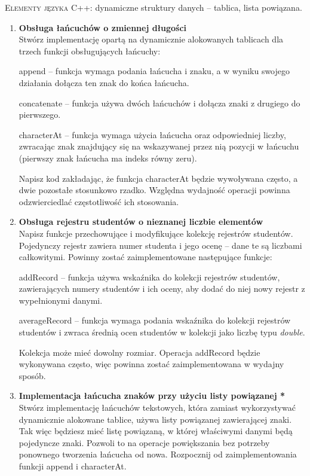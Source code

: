 \documentclass[12pt]{article}
\begin{document}
\small \textsc{Elementy języka C++:} dynamiczne struktury danych -- tablica, lista powiązana.

\begin{enumerate}

\item \textbf{Obsługa łańcuchów o zmiennej długości}\\
Stwórz implementację opartą na dynamicznie alokowanych tablicach dla trzech funkcji obsługujących łańcuchy:

\textsf{append} -- funkcja wymaga podania łańcucha i znaku, a w wyniku swojego działania dołącza ten znak do końca łańcucha.

\textsf{concatenate} -- funkcja używa dwóch łańcuchów i dołącza znaki z drugiego do pierwszego.

\textsf{characterAt} -- funkcja wymaga użycia łańcucha oraz odpowiedniej liczby, zwracając znak znajdujący się na wskazywanej przez nią pozycji w łańcuchu (pierwszy znak łańcucha ma indeks równy zeru).

Napisz kod zakładając, że funkcja \textsf{characterAt} będzie wywoływana często, a dwie pozostałe stosunkowo rzadko. Względna wydajność operacji powinna odzwierciedlać częstotliwość ich stosowania.

\item \textbf{Obsługa rejestru studentów o nieznanej liczbie elementów}\\
Napisz funkcje przechowujące i modyfikujące kolekcję rejestrów studentów. Pojedynczy rejestr zawiera numer studenta i jego ocenę -- dane te są liczbami całkowitymi. Powinny zostać zaimplementowane następujące funkcje:

\textsf{addRecord} -- funkcja używa wskaźnika do kolekcji rejestrów studentów, zawierających numery studentów i ich oceny, aby dodać do niej nowy rejestr z wypełnionymi danymi.

\textsf{averageRecord} -- funkcja wymaga podania wskaźnika do kolekcji rejestrów studentów i zwraca średnią ocen studentów w kolekcji jako liczbę typu \textit{double}.

Kolekcja może mieć dowolny rozmiar. Operacja \textsf{addRecord} będzie wykonywana często, więc powinna zostać zaimplementowana w wydajny sposób.

\item \textbf{Implementacja łańcucha znaków przy użyciu listy powiązanej *}\\
Stwórz implementację łańcuchów tekstowych, która zamiast wykorzystywać dynamicznie alokowane tablice, używa listy powiązanej zawierającej znaki. Tak więc będziesz mieć listę powiązaną, w której właściwymi danymi będą pojedyncze znaki. Pozwoli to na operacje powiększania bez potrzeby ponownego tworzenia łańcucha od nowa. Rozpocznij od zaimplementowania funkcji \textsf{append} i \textsf{characterAt}.



\end{enumerate}
\end{document}
